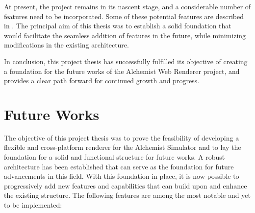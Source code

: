 At present, the project remains in its nascent stage, and a considerable number of features need to be incorporated. Some of these potential features are described in . The principal aim of this thesis was to establish a solid foundation that would facilitate the seamless addition of features in the future, while minimizing modifications in the existing architecture.\newline

In conclusion, this project thesis has successfully fulfilled its objective of creating a foundation for the future works of the Alchemist Web Renderer project, and provides a clear path forward for continued growth and progress.\newline

\section{Future Works}
\label{sec:future-works}
The objective of this project thesis was to prove the feasibility of developing a flexible and cross-platform renderer for the Alchemist Simulator and to lay the foundation for a solid and functional structure for future works. A robust architecture has been established that can serve as the foundation for future advancements in this field. With this foundation in place, it is now possible to progressively add new features and capabilities that can build upon and enhance the existing structure. The following features are among the most notable and yet to be implemented:
